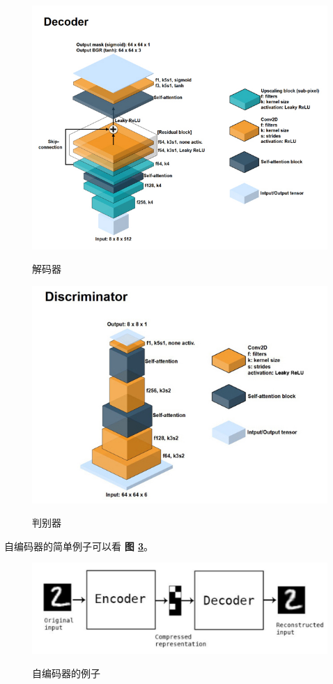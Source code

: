 \begin{figure}[h!]
	\caption{解码器}
	\centering
	\includegraphics[width=\textwidth]{figure/resources/decode.jpg}
	\label{fig:decode}
\end{figure}

\begin{figure}[h!]
	\caption{判别器}
	\centering
	\includegraphics[width=\textwidth]{figure/resources/disc.jpg}
	\label{fig:disc}
\end{figure}

自编码器的简单例子可以看 \textbf{图 \ref{fig:encode_decode}}。

\begin{figure}[h!]
	\caption{自编码器的例子}
	\centering
	\includegraphics[width=\textwidth]{figure/resources/encode_decode.jpg}
	\label{fig:encode_decode}
\end{figure}

